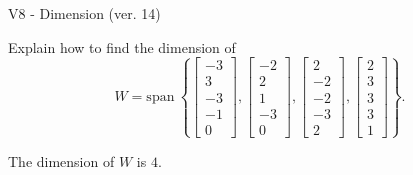 \begin{exercise}
  \begin{exerciseTitle}V8 - Dimension (ver. 14)\end{exerciseTitle}
  \begin{exerciseStatement}
    Explain how to find the dimension of 
\[W=\mathrm{span}\ \left\{\left[\begin{array}{r}
-3 \\
3 \\
-3 \\
-1 \\
0
\end{array}\right] , \left[\begin{array}{r}
-2 \\
2 \\
1 \\
-3 \\
0
\end{array}\right] , \left[\begin{array}{r}
2 \\
-2 \\
-2 \\
-3 \\
2
\end{array}\right] , \left[\begin{array}{r}
2 \\
3 \\
3 \\
3 \\
1
\end{array}\right]\right\}.\]



  \end{exerciseStatement}
  \begin{exerciseAnswer}
   The dimension of \(W\) is  \(4\).
  


  \end{exerciseAnswer}
\end{exercise}